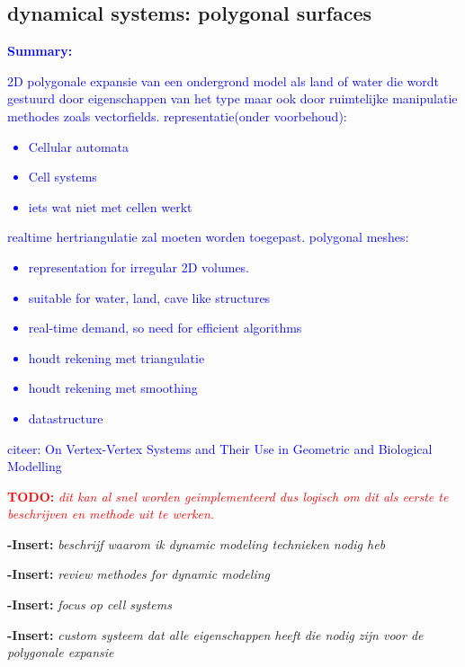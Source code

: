 \documentclass{article}
\newcommand{\todo}[1]{\textcolor{red}{\textbf{TODO: }\it{#1}}}
\newcommand{\inhoud}[1]{\textcolor{blue}{\textbf{Summary: }\it{#1}}}
\newcommand{\voegtoe}[1]{\textcolor{MyDarkGreen}{\textbf{-Insert: }\it{#1}}\newline}
\begin{document}
\subsection{dynamical systems: polygonal surfaces}
\inhoud{2D polygonale expansie van een ondergrond model als land of water die wordt gestuurd door eigenschappen van het type maar ook door ruimtelijke manipulatie methodes zoals vectorfields. representatie(onder voorbehoud): 
\begin{itemize}
\item Cellular automata
\item Cell systems
\item iets wat niet met cellen werkt  
\end{itemize}
realtime hertriangulatie zal moeten worden toegepast. 
polygonal meshes: 
\begin{itemize}
\item representation for irregular 2D volumes.  
\item suitable for water, land, cave like structures  
\item real-time demand, so need for efficient algorithms
\item houdt rekening met triangulatie
\item houdt rekening met smoothing
\item datastructure
\end{itemize}
citeer: On Vertex-Vertex Systems and Their Use in
Geometric and Biological Modelling
}

\todo{dit kan al snel worden geimplementeerd dus logisch om dit als eerste te beschrijven en methode uit te werken.}

\voegtoe{beschrijf waarom ik dynamic modeling technieken nodig heb}



\voegtoe{review methodes for dynamic modeling}


\voegtoe{focus op cell systems}


\voegtoe{custom systeem dat alle eigenschappen heeft die nodig zijn voor de polygonale expansie}



\cite{compgeom}
\cite{vertexsystems}
\end{document}
